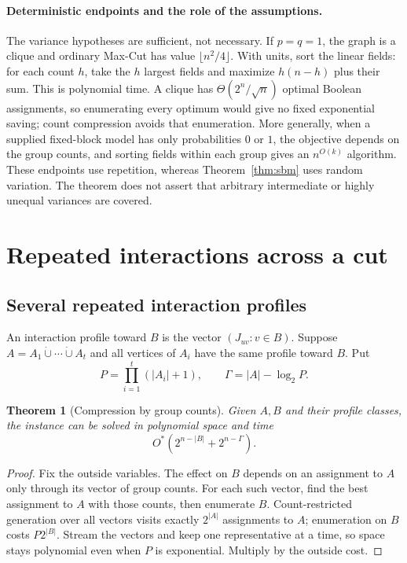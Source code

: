 \documentclass[11pt,a4paper]{article}
\newtheorem{theorem}{Theorem}[section]
\theoremstyle{definition}
\theoremstyle{remark}
\newcommand{\Ostar}{O^{*}}
\begin{document}
\paragraph{Deterministic endpoints and the role of the assumptions.}
The variance hypotheses are sufficient, not necessary. If $p=q=1$,
the graph is a clique and ordinary Max-Cut has value $\lfloor n^2/4\rfloor$.
With units, sort the linear fields: for each count $h$, take the $h$
largest fields and maximize $h(n-h)$ plus their sum. This is polynomial
time. A clique has $\Theta(2^n/\sqrt n)$ optimal Boolean assignments,
so enumerating every optimum would give no fixed exponential saving;
count compression avoids that enumeration. More generally, when a supplied
fixed-block model has only probabilities $0$ or $1$, the objective depends
on the group counts, and sorting fields within each group gives an
$n^{O(k)}$ algorithm. These endpoints use repetition, whereas
Theorem~\ref{thm:sbm} uses random variation. The theorem does not assert
that arbitrary intermediate or highly unequal variances are covered.

\section{Repeated interactions across a cut}\label{sec:structure}

\subsection{Several repeated interaction profiles}

An interaction profile toward $B$ is the vector $(J_{uv}:v\in B)$.
Suppose $A=A_1\mathbin{\dot\cup}\cdots\mathbin{\dot\cup}A_t$ and all vertices
of $A_i$ have the same profile toward $B$. Put
\[
 P=\prod_{i=1}^t(|A_i|+1),\qquad
 \Gamma=|A|-\log_2 P.
\]

\begin{theorem}[Compression by group counts]\label{thm:profiles}
Given $A,B$ and their profile classes, the instance can be solved in
polynomial space and time
\[
 \Ostar\left(2^{n-|B|}+2^{n-\Gamma}\right).
\]
\end{theorem}
\begin{proof}
Fix the outside variables. The effect on $B$ depends on an assignment to
$A$ only through its vector of group counts. For each such vector, find the
best assignment to $A$ with those counts, then enumerate $B$.
Count-restricted generation over all vectors visits exactly $2^{|A|}$
assignments to $A$; enumeration on $B$ costs $P2^{|B|}$.
Stream the vectors and keep one representative at a time, so space stays
polynomial even when $P$ is exponential. Multiply by the outside cost.
\end{proof}
\end{document}
